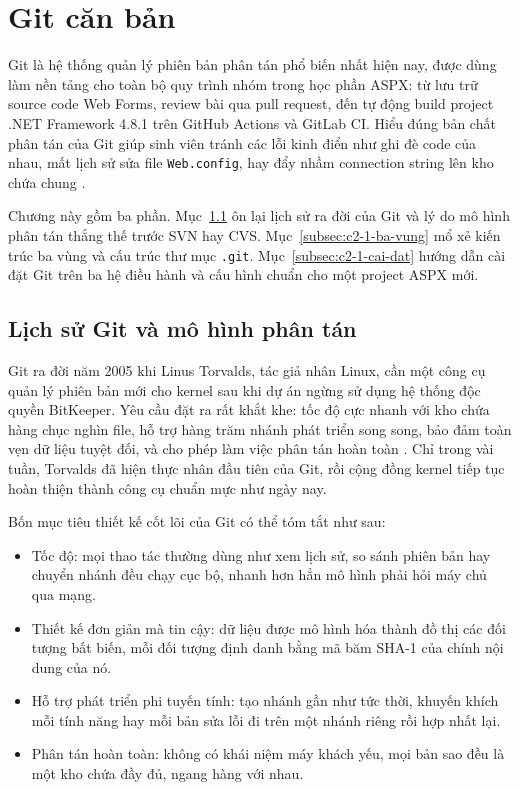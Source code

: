 \section{Git căn bản}
\label{sec:c2-1-git-can-ban}

Git là hệ thống quản lý phiên bản phân tán phổ biến nhất hiện nay, được dùng làm nền tảng cho toàn bộ quy trình nhóm trong học phần ASPX: từ lưu trữ source code Web Forms, review bài qua pull request, đến tự động build project .NET Framework 4.8.1 trên GitHub Actions và GitLab CI. Hiểu đúng bản chất phân tán của Git giúp sinh viên tránh các lỗi kinh điển như ghi đè code của nhau, mất lịch sử sửa file \texttt{Web.config}, hay đẩy nhầm connection string lên kho chứa chung \cite{progit}.

Chương này gồm ba phần. Mục~\ref{subsec:c2-1-lich-su} ôn lại lịch sử ra đời của Git và lý do mô hình phân tán thắng thế trước SVN hay CVS. Mục~\ref{subsec:c2-1-ba-vung} mổ xẻ kiến trúc ba vùng và cấu trúc thư mục \texttt{.git}. Mục~\ref{subsec:c2-1-cai-dat} hướng dẫn cài đặt Git trên ba hệ điều hành và cấu hình chuẩn cho một project ASPX mới.

\subsection{Lịch sử Git và mô hình phân tán}
\label{subsec:c2-1-lich-su}

Git ra đời năm 2005 khi Linus Torvalds, tác giả nhân Linux, cần một công cụ quản lý phiên bản mới cho kernel sau khi dự án ngừng sử dụng hệ thống độc quyền BitKeeper. Yêu cầu đặt ra rất khắt khe: tốc độ cực nhanh với kho chứa hàng chục nghìn file, hỗ trợ hàng trăm nhánh phát triển song song, bảo đảm toàn vẹn dữ liệu tuyệt đối, và cho phép làm việc phân tán hoàn toàn \cite{progit}. Chỉ trong vài tuần, Torvalds đã hiện thực nhân đầu tiên của Git, rồi cộng đồng kernel tiếp tục hoàn thiện thành công cụ chuẩn mực như ngày nay.

Bốn mục tiêu thiết kế cốt lõi của Git có thể tóm tắt như sau:

\begin{itemize}
\item Tốc độ: mọi thao tác thường dùng như xem lịch sử, so sánh phiên bản hay chuyển nhánh đều chạy cục bộ, nhanh hơn hẳn mô hình phải hỏi máy chủ qua mạng.
\item Thiết kế đơn giản mà tin cậy: dữ liệu được mô hình hóa thành đồ thị các đối tượng bất biến, mỗi đối tượng định danh bằng mã băm SHA-1 của chính nội dung của nó.
\item Hỗ trợ phát triển phi tuyến tính: tạo nhánh gần như tức thời, khuyến khích mỗi tính năng hay mỗi bản sửa lỗi đi trên một nhánh riêng rồi hợp nhất lại.
\item Phân tán hoàn toàn: không có khái niệm máy khách yếu, mọi bản sao đều là một kho chứa đầy đủ, ngang hàng với nhau.
\end{itemize}

